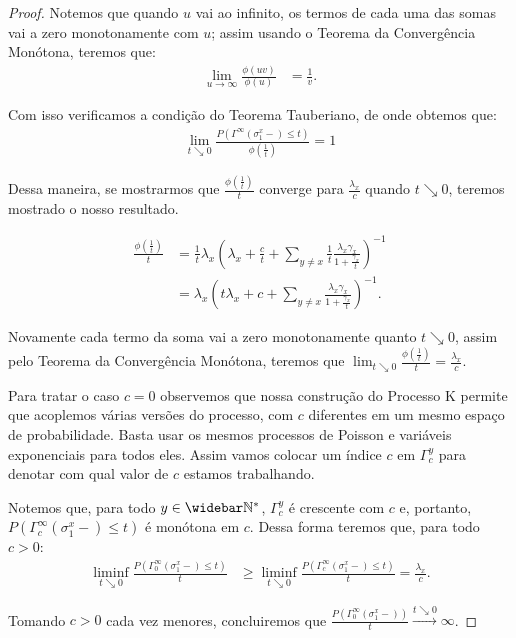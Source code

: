 \begin{proof}
  Notemos que quando $u$ vai ao infinito, os termos de cada uma das
  somas vai a zero monotonamente com $u$; assim usando o Teorema da
  Convergência Monótona, teremos que:
  \begin{align*}
      \lim_{u \to \infty} \frac{\phi(uv)}{\phi (u)} &= \frac{1}{v}.
  \end{align*}

  Com isso verificamos a condição do Teorema Tauberiano, de onde
  obtemos que:
  \begin{align*}
    \lim_{t \searrow 0} \frac{P( \Gamma^\infty(\sigma^x_1-) \leq
      t)}{\phi(\frac{1}{t})} = 1
  \end{align*}

  Dessa maneira, se mostrarmos que $\frac{\phi(\frac{1}{t})}{t}$
  converge para $\frac{\lambda_x}{c}$ quando $t \searrow 0$, teremos
  mostrado o nosso resultado.

  \begin{align*}
    \frac{\phi(\frac{1}{t})}{t} &= \frac{1}{t} \lambda_x \left(
      \lambda_x + \frac{c}{t} + \sum_{y \neq x} \frac{1}{t}
      \frac{\lambda_x \gamma_x}{1 + \frac{\gamma_x}{t}} \right)^{-1} \\
    &= \lambda_x \left( t\lambda_x + c + \sum_{y \neq x}
      \frac{\lambda_x \gamma_x}{1 + \frac{\gamma_x}{t}} \right)^{-1}.
  \end{align*}

  Novamente cada termo da soma vai a zero monotonamente quanto $t
  \searrow 0$, assim pelo Teorema da Convergência Monótona, teremos que
  $\lim_{t \searrow 0} \frac{\phi(\frac{1}{t})}{t} =
  \frac{\lambda_x}{c}$.

  Para tratar o caso $c = 0$ observemos que nossa construção do
  Processo K permite que acoplemos várias versões do processo, com $c$
  diferentes em um mesmo espaço de probabilidade. Basta usar os mesmos
  processos de Poisson e variáveis exponenciais para todos eles. Assim
  vamos colocar um índice $c$ em $\Gamma^y_c$ para denotar com qual
  valor de $c$ estamos trabalhando.

  Notemos que, para todo $y \in \Nzb$, $\Gamma^y_c$ é crescente com
  $c$ e, portanto, $P ( \Gamma^\infty_c(\sigma^x_1-) \leq t)$ é
  monótona em $c$.  Dessa forma teremos que, para todo $c > 0$:
  \begin{align*}
    \liminf_{t \searrow 0} \frac{P ( \Gamma^\infty_0(\sigma^x_1-) \leq
      t)}{t} &\geq \liminf_{t \searrow 0} \frac{P (
      \Gamma^\infty_c(\sigma^x_1-) \leq t)}{t}
    = \frac{\lambda_x}{c}.
  \end{align*}

  Tomando $c > 0$ cada vez menores, concluiremos que $\frac{P (
    \Gamma^\infty_0(\sigma^x_1-))}{t} \xrightarrow{t \searrow 0}
  \infty$.
\end{proof}

